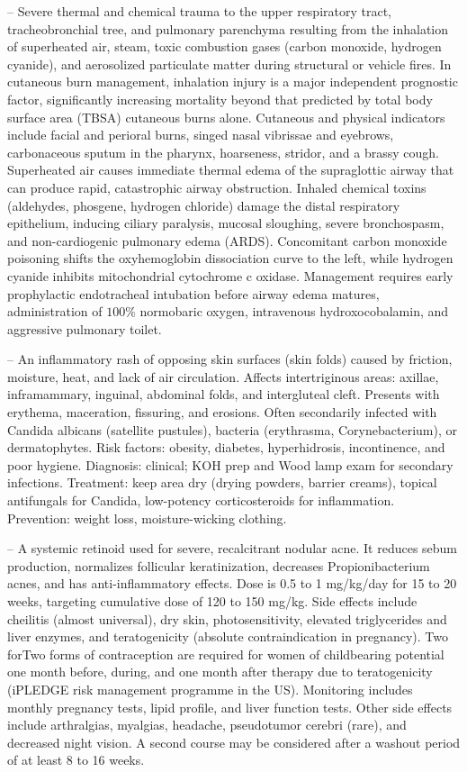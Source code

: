 -- Severe thermal and chemical trauma to the upper respiratory tract, tracheobronchial tree, and pulmonary parenchyma resulting from the inhalation of superheated air, steam, toxic combustion gases (carbon monoxide, hydrogen cyanide), and aerosolized particulate matter during structural or vehicle fires. In cutaneous burn management, inhalation injury is a major independent prognostic factor, significantly increasing mortality beyond that predicted by total body surface area (TBSA) cutaneous burns alone. Cutaneous and physical indicators include facial and perioral burns, singed nasal vibrissae and eyebrows, carbonaceous sputum in the pharynx, hoarseness, stridor, and a brassy cough. Superheated air causes immediate thermal edema of the supraglottic airway that can produce rapid, catastrophic airway obstruction. Inhaled chemical toxins (aldehydes, phosgene, hydrogen chloride) damage the distal respiratory epithelium, inducing ciliary paralysis, mucosal sloughing, severe bronchospasm, and non-cardiogenic pulmonary edema (ARDS). Concomitant carbon monoxide poisoning shifts the oxyhemoglobin dissociation curve to the left, while hydrogen cyanide inhibits mitochondrial cytochrome c oxidase. Management requires early prophylactic endotracheal intubation before airway edema matures, administration of $100\%$ normobaric oxygen, intravenous hydroxocobalamin, and aggressive pulmonary toilet.

-- An inflammatory rash of opposing skin surfaces (skin folds) caused by friction, moisture, heat, and lack of air circulation. Affects intertriginous areas: axillae, inframammary, inguinal, abdominal folds, and intergluteal cleft. Presents with erythema, maceration, fissuring, and erosions. Often secondarily infected with Candida albicans (satellite pustules), bacteria (erythrasma, Corynebacterium), or dermatophytes. Risk factors: obesity, diabetes, hyperhidrosis, incontinence, and poor hygiene. Diagnosis: clinical; KOH prep and Wood lamp exam for secondary infections. Treatment: keep area dry (drying powders, barrier creams), topical antifungals for Candida, low-potency corticosteroids for inflammation. Prevention: weight loss, moisture-wicking clothing.

-- A systemic retinoid used for severe, recalcitrant nodular acne. It reduces sebum production, normalizes follicular keratinization, decreases Propionibacterium acnes, and has anti-inflammatory effects. Dose is 0.5 to 1 mg/kg/day for 15 to 20 weeks, targeting cumulative dose of 120 to 150 mg/kg. Side effects include cheilitis (almost universal), dry skin, photosensitivity, elevated triglycerides and liver enzymes, and teratogenicity (absolute contraindication in pregnancy). Two forTwo forms of contraception are required for women of childbearing potential one month before, during, and one month after therapy due to teratogenicity (iPLEDGE risk management programme in the US). Monitoring includes monthly pregnancy tests, lipid profile, and liver function tests. Other side effects include arthralgias, myalgias, headache, pseudotumor cerebri (rare), and decreased night vision. A second course may be considered after a washout period of at least 8 to 16 weeks.

